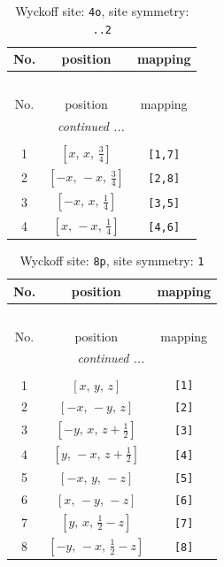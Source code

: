 \documentclass[fleqn,8pt]{jsarticle}
\begin{document}
\renewcommand{\arraystretch}{1.2}
\begin{longtable}{ccc}
\caption{Wyckoff site: {\tt 4o}, site symmetry: {\tt ..2}}
 \\
 \hline \hline
No. & position & mapping \\ \hline \endfirsthead

\multicolumn{2}{l}{\tablename\ \thetable{}} \\
 \hline \hline
No. & position & mapping \\ \hline \endhead

 \hline \hline
\multicolumn{2}{r}{\footnotesize\it continued ...} \\ \endfoot

 \hline \hline
\multicolumn{2}{r}{} \\ \endlastfoot

1 & $\left[ x,\, x,\, \frac{3}{4} \right]$ & {\tt [1,7]} \\ \hline
2 & $\left[ - x,\, - x,\, \frac{3}{4} \right]$ & {\tt [2,8]} \\ \hline
3 & $\left[ - x,\, x,\, \frac{1}{4} \right]$ & {\tt [3,5]} \\ \hline
4 & $\left[ x,\, - x,\, \frac{1}{4} \right]$ & {\tt [4,6]} \\
\end{longtable}
\renewcommand{\arraystretch}{1.2}
\begin{longtable}{ccc}
\caption{Wyckoff site: {\tt 8p}, site symmetry: {\tt 1}}
 \\
 \hline \hline
No. & position & mapping \\ \hline \endfirsthead

\multicolumn{2}{l}{\tablename\ \thetable{}} \\
 \hline \hline
No. & position & mapping \\ \hline \endhead

 \hline \hline
\multicolumn{2}{r}{\footnotesize\it continued ...} \\ \endfoot

 \hline \hline
\multicolumn{2}{r}{} \\ \endlastfoot

1 & $\left[ x,\, y,\, z \right]$ & {\tt [1]} \\ \hline
2 & $\left[ - x,\, - y,\, z \right]$ & {\tt [2]} \\ \hline
3 & $\left[ - y,\, x,\, z + \frac{1}{2} \right]$ & {\tt [3]} \\ \hline
4 & $\left[ y,\, - x,\, z + \frac{1}{2} \right]$ & {\tt [4]} \\ \hline
5 & $\left[ - x,\, y,\, - z \right]$ & {\tt [5]} \\ \hline
6 & $\left[ x,\, - y,\, - z \right]$ & {\tt [6]} \\ \hline
7 & $\left[ y,\, x,\, \frac{1}{2} - z \right]$ & {\tt [7]} \\ \hline
8 & $\left[ - y,\, - x,\, \frac{1}{2} - z \right]$ & {\tt [8]} \\
\end{longtable}
\end{document}
